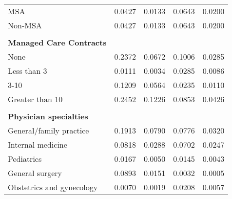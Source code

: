 {\begin{center}
\begin{longtable}{lllll}
MSA                                    & 0.0427                   & 0.0133              & 0.0643                    & 0.0200               \\
Non-MSA                                & 0.0427                   & 0.0133              & 0.0643                    & 0.0200               \\
                                       &                          &                     &                           &                      \\
\textbf{Managed Care Contracts}        &                          &                     &                           &                      \\
None                                   & 0.2372                   & 0.0672              & 0.1006                    & 0.0285               \\
Less than 3                            & 0.0111                   & 0.0034              & 0.0285                    & 0.0086               \\
3-10                                   & 0.1209                   & 0.0564              & 0.0235                    & 0.0110               \\
Greater than 10                        & 0.2452                   & 0.1226              & 0.0853                    & 0.0426               \\
                                       &                          &                     &                           &                      \\
\textbf{Physician specialties}         &                          &                     &                           &                      \\
General/family practice                & 0.1913                   & 0.0790              & 0.0776                    & 0.0320               \\
Internal medicine                      & 0.0818                   & 0.0288              & 0.0702                    & 0.0247               \\
Pediatrics                             & 0.0167                   & 0.0050              & 0.0145                    & 0.0043               \\
General surgery                        & 0.0893                   & 0.0151              & 0.0032                    & 0.0005               \\
Obstetrics and gynecology              & 0.0070                   & 0.0019              & 0.0208                    & 0.0057               \\

\end{longtable}
\end{center}}
